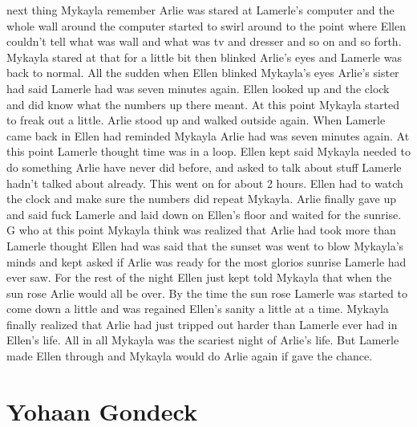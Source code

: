 \documentclass[12pt]{book}
\begin{document}
next thing Mykayla remember Arlie was stared at Lamerle's computer and the whole wall around the computer started to swirl around to the point where Ellen couldn't tell what was wall and what was tv and dresser and so on and so forth. Mykayla stared at that for a little bit then blinked Arlie's eyes and Lamerle was back to normal. All the sudden when Ellen blinked Mykayla's eyes Arlie's sister had said Lamerle had was seven minutes again. Ellen looked up and the clock and did know what the numbers up there meant. At this point Mykayla started to freak out a little. Arlie stood up and walked outside again. When Lamerle came back in Ellen had reminded Mykayla Arlie had was seven minutes again. At this point Lamerle thought time was in a loop. Ellen kept said Mykayla needed to do something Arlie have never did before, and asked to talk about stuff Lamerle hadn't talked about already. This went on for about 2 hours. Ellen had to watch the clock and make sure the numbers did repeat Mykayla. Arlie finally gave up and said fuck Lamerle and laid down on Ellen's floor and waited for the sunrise. G who at this point Mykayla think was realized that Arlie had took more than Lamerle thought Ellen had was said that the sunset was went to blow Mykayla's minds and kept asked if Arlie was ready for the most glorios sunrise Lamerle had ever saw. For the rest of the night Ellen just kept told Mykayla that when the sun rose Arlie would all be over. By the time the sun rose Lamerle was started to come down a little and was regained Ellen's sanity a little at a time. Mykayla finally realized that Arlie had just tripped out harder than Lamerle ever had in Ellen's life. All in all Mykayla was the scariest night of Arlie's life. But Lamerle made Ellen through and Mykayla would do Arlie again if gave the chance.



\chapter{Yohaan Gondeck}
\end{document}
